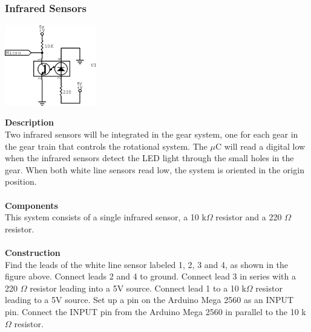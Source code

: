 \documentclass[titlepage]{article}
\begin{document}
\subsubsection{Infrared Sensors}
\begin{center}
	\includegraphics[width = 0.3\textwidth]{IRSensor.png}
\label{fig:IRSensorFig}
\end{center}
\textbf{Description}\\
Two infrared sensors will be integrated in the gear system, one for each gear in the gear train that controls the rotational system. The $\mu$C will read a digital low when the infrared sensors detect the LED light through the small holes in the gear. When both white line sensors read low, the system is oriented in the origin position.\\\\
\textbf{Components}\\
This system consists of a single infrared sensor, a 10 k$\Omega$ resistor and a 220 $\Omega$ resistor.\\\\
\textbf{Construction}\\
Find the leads of the white line sensor labeled 1, 2, 3 and 4, as shown in the figure above.  Connect leads 2 and 4 to ground. Connect lead 3 in series with a 220 $\Omega$ resistor leading into a 5V source. Connect lead 1 to a 10 k$\Omega$ resistor leading to a 5V source. Set up a pin on the Arduino Mega 2560 as an INPUT pin. Connect the INPUT pin from the Arduino Mega 2560 in parallel to the 10 k$\Omega$ resistor.
\end{document}
